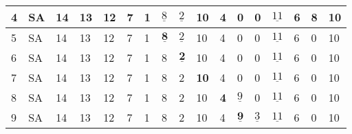 \begin{table}
{\begin{tabular}{l|l|lllllllllllllll}
			4       & SA & 14          & 13                                  & 12                                  & 7          & \textbf{1} & $\underline{8}$           & $\underline{2}$           & 10          & 4          & 0                                       & 0                                       & $\underline{11}$                         & \cellcolor[HTML]{32CB00}6 & 8                         & 10                        \\ \hline
			5       & SA & 14          & 13                                  & 12                                  & 7          & 1          & $\underline{\textbf{8}}$  & $\underline{2}$           & 10          & 4          & 0                                       & 0                                       & $\underline{11}$                         & 6                         & \cellcolor[HTML]{32CB00}0 & 10                        \\ \hline
			6       & SA & 14          & 13                                  & 12                                  & 7          & 1          & \cellcolor[HTML]{34CDF9}8 & $\underline{\textbf{2}}$  & 10          & 4          & 0                                       & 0                                       & $\underline{11}$                         & 6                         & 0                         & 10                        \\ \hline
			7       & SA & 14          & 13                                  & 12                                  & 7          & 1          & 8                         & \cellcolor[HTML]{34CDF9}2 & \textbf{10} & 4          & 0                                       & 0                                       & $\underline{11}$                         & 6                         & 0                         & 10                        \\ \hline
			8       & SA & 14          & 13                                  & 12                                  & 7          & 1          & 8                         & 2                         & 10          & \textbf{4} & \cellcolor[HTML]{32CB00}$\underline{9}$ & 0                                       & $\underline{11}$                         & 6                         & 0                         & 10                        \\ \hline
			9       & SA & 14          & 13                                  & 12                                  & 7          & 1          & 8                         & 2                         & 10          & 4          & $\underline{\textbf{9}}$                & \cellcolor[HTML]{32CB00}$\underline{3}$ & $\underline{11}$                         & 6                         & 0                         & 10                        \\ \hline

\end{tabular}}
\end{table}

